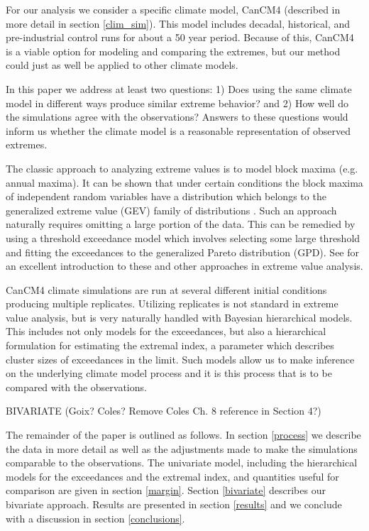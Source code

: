 For our analysis we consider a specific climate model, CanCM4 (described in more detail in section \ref{clim_sim}). This model includes decadal, historical, and pre-industrial control runs for about a 50 year period. Because of this, CanCM4 is a viable option for modeling and comparing the extremes, but our method could just as well be applied to other climate models.

In this paper we address at least two questions: 1) Does using the same climate model in different ways produce similar extreme behavior? and 2) How well do the simulations agree with the observations? Answers to these questions would inform us whether the climate model is a reasonable representation of observed extremes.


The classic approach to analyzing extreme values is to model block maxima (e.g. annual maxima). It can be shown that under certain conditions the block maxima of independent random variables have a distribution which belongs to the generalized extreme value (GEV) family of distributions \citep{coles2001introduction}. Such an approach naturally requires omitting a large portion of the data. This can be remedied by using a threshold exceedance model which involves selecting some large threshold and fitting the exceedances to the generalized Pareto distribution (GPD). See \cite{coles2001introduction} for an excellent introduction to these and other approaches in extreme value analysis.

CanCM4 climate simulations are run at several different initial conditions producing multiple replicates. Utilizing replicates is not standard in extreme value analysis, but is very naturally handled with Bayesian hierarchical models. This includes not only models for the exceedances, but also a hierarchical formulation for estimating the extremal index, a parameter which describes cluster sizes of exceedances in the limit. Such models allow us to make inference on the underlying climate model process and it is this process that is to be compared with the observations.

BIVARIATE (Goix? Coles? Remove Coles Ch. 8 reference in Section 4?)

The remainder of the paper is outlined as follows. In section \ref{process} we describe the data in more detail as well as the adjustments made to make the simulations comparable to the observations. The univariate model, including the hierarchical models for the exceedances and the extremal index, and quantities useful for comparison are given in section \ref{margin}. Section \ref{bivariate} describes our bivariate approach. Results are presented in section \ref{results} and we conclude with a discussion in section \ref{conclusions}.


